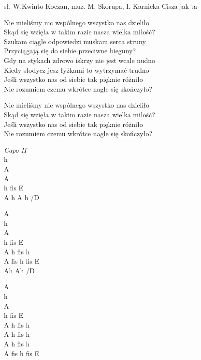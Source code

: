 {sł. W.Kwinto-Koczan, muz. M. Skorupa, I. Karnicka}
{Cisza jak ta}
\begin{text}
    \ifOneCol \else \small{ \fi
\hfill\break
Nie mieliśmy nic wspólnego wszystko nas dzieliło\\
Skąd się wzięła w takim razie nasza wielka miłość?\\
Szukam ciągle odpowiedzi muskam serca struny\\
Przyciągają się do siebie przeciwne bieguny?\\

\hfill\break
Gdy na stykach zdrowo iskrzy nie jest wcale nudno\\
Kiedy słodycz jesz łyżkami to wytrzymać trudno\\
Jeśli wszystko nas od siebie tak pięknie różniło\\
Nie rozumiem czemu wkrótce nagle się skończyło?

\hfill\break
\hfill\break
\hfill\break
Nie mieliśmy nic wspólnego wszystko nas dzieliło\\
Skąd się wzięła w takim razie nasza wielka miłość?\\
Jeśli wszystko nas od siebie tak pięknie różniło\\
Nie rozumiem czemu wkrótce nagle się skończyło?

\hfill\break
\hfill\break
\hfill\break
    \ifOneCol \else }\fi
\end{text}
\begin{chord}
\ifOneCol \else \small{ \fi
\textit{Capo II}\\
h\\
A\\
A\\
h fis E\\
\OneColVin A h A h /D

A\\
h\\
A\\
h fis E\\
\OneColVin A h fis h\\
\OneColVin  A fis h fis E\\
\OneColVin Ah Ah /D

A\\
h\\
A\\
h fis E\\
\OneColVin A h fis h\\
\OneColVin A h fis h\\
\OneColVin A h fis h\\
\OneColVin A fis h fis E
\ifOneCol \else }\fi
\end{chord}
